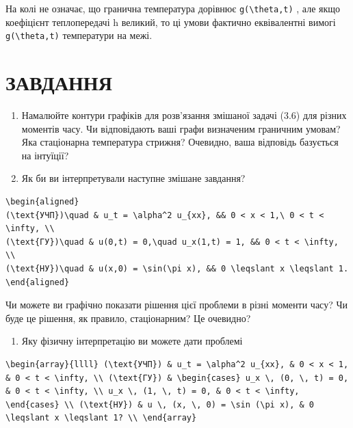 \documentclass[
  ukrainian,
]{article}
\providecommand{\tightlist}{%
  \setlength{\itemsep}{0pt}\setlength{\parskip}{0pt}}
\begin{document}
На колі не означає, що гранична температура дорівнює
\texttt{g(\textbackslash{}theta,t)} , але якщо коефіцієнт теплопередачі
h великий, то ці умови фактично еквівалентні вимогі
\texttt{g(\textbackslash{}theta,t)} температури на межі.

\section{ЗАВДАННЯ}\label{ux437ux430ux432ux434ux430ux43dux43dux44f-1}

\begin{enumerate}
\def\labelenumi{\arabic{enumi}.}
\item
  Намалюйте контури графіків для розв'язання змішаної задачі (3.6) для
  різних моментів часу. Чи відповідають ваші графи визначеним граничним
  умовам? Яка стаціонарна температура стрижня? Очевидно, ваша відповідь
  базується на інтуїції?
\item
  Як би ви інтерпретували наступне змішане завдання?
\end{enumerate}

\begin{verbatim}
\begin{aligned}
(\text{УЧП})\quad & u_t = \alpha^2 u_{xx}, && 0 < x < 1,\ 0 < t < \infty, \\
(\text{ГУ})\quad & u(0,t) = 0,\quad u_x(1,t) = 1, && 0 < t < \infty, \\
(\text{НУ})\quad & u(x,0) = \sin(\pi x), && 0 \leqslant x \leqslant 1.
\end{aligned}
\end{verbatim}

Чи можете ви графічно показати рішення цієї проблеми в різні моменти
часу? Чи буде це рішення, як правило, стаціонарним? Це очевидно?

\begin{enumerate}
\def\labelenumi{\arabic{enumi}.}
\setcounter{enumi}{2}
\tightlist
\item
  Яку фізичну інтерпретацію ви можете дати проблемі
\end{enumerate}

\begin{verbatim}
\begin{array}{llll} (\text{УЧП}) & u_t = \alpha^2 u_{xx}, & 0 < x < 1, & 0 < t < \infty, \\ (\text{ГУ}) & \begin{cases} u_x \, (0, \, t) = 0, & 0 < t < \infty, \\ u_x \, (1, \, t) = 0, & 0 < t < \infty, \end{cases} \\ (\text{НУ}) & u \, (x, \, 0) = \sin (\pi x), & 0 \leqslant x \leqslant 1? \\ \end{array}
\end{verbatim}
\end{document}

